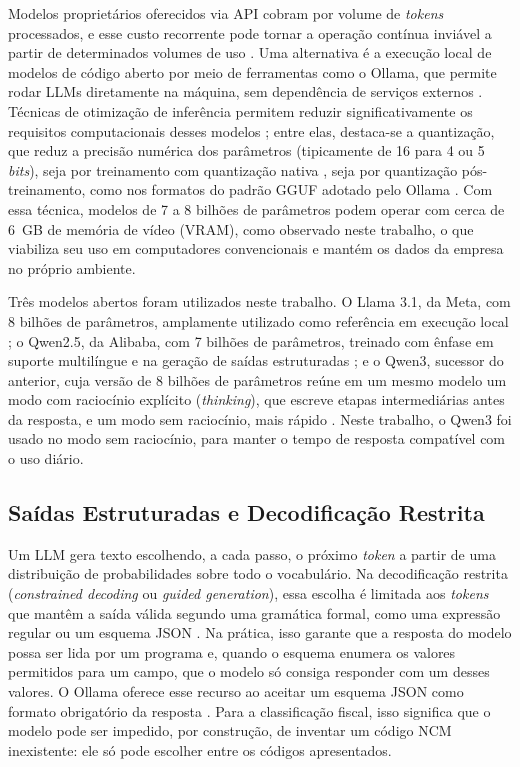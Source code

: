 Modelos proprietários oferecidos via API cobram por volume de \textit{tokens} processados, e esse custo recorrente pode tornar a operação contínua inviável a partir de determinados volumes de uso \cite{pan2025costbenefit}. Uma alternativa é a execução local de modelos de código aberto por meio de ferramentas como o Ollama, que permite rodar LLMs diretamente na máquina, sem dependência de serviços externos \cite{ollama2023}. Técnicas de otimização de inferência permitem reduzir significativamente os requisitos computacionais desses modelos \cite{zhou2024efficientllm}; entre elas, destaca-se a quantização, que reduz a precisão numérica dos parâmetros (tipicamente de 16 para 4 ou 5 \textit{bits}), seja por treinamento com quantização nativa \cite{liu2024llmqat}, seja por quantização pós-treinamento, como nos formatos do padrão GGUF adotado pelo Ollama \cite{ollama2023}. Com essa técnica, modelos de 7 a 8 bilhões de parâmetros podem operar com cerca de 6~GB de memória de vídeo (VRAM), como observado neste trabalho, o que viabiliza seu uso em computadores convencionais e mantém os dados da empresa no próprio ambiente.

Três modelos abertos foram utilizados neste trabalho. O Llama 3.1, da Meta, com 8 bilhões de parâmetros, amplamente utilizado como referência em execução local \cite{grattafiori2024llama3}; o Qwen2.5, da Alibaba, com 7 bilhões de parâmetros, treinado com ênfase em suporte multilíngue e na geração de saídas estruturadas \cite{qwen2024qwen25}; e o Qwen3, sucessor do anterior, cuja versão de 8 bilhões de parâmetros reúne em um mesmo modelo um modo com raciocínio explícito (\textit{thinking}), que escreve etapas intermediárias antes da resposta, e um modo sem raciocínio, mais rápido \cite{yang2025qwen3}. Neste trabalho, o Qwen3 foi usado no modo sem raciocínio, para manter o tempo de resposta compatível com o uso diário.

\subsection{Saídas Estruturadas e Decodificação Restrita}

Um LLM gera texto escolhendo, a cada passo, o próximo \textit{token} a partir de uma distribuição de probabilidades sobre todo o vocabulário. Na decodificação restrita (\textit{constrained decoding} ou \textit{guided generation}), essa escolha é limitada aos \textit{tokens} que mantêm a saída válida segundo uma gramática formal, como uma expressão regular ou um esquema JSON \cite{willard2023guided}. Na prática, isso garante que a resposta do modelo possa ser lida por um programa e, quando o esquema enumera os valores permitidos para um campo, que o modelo só consiga responder com um desses valores. O Ollama oferece esse recurso ao aceitar um esquema JSON como formato obrigatório da resposta \cite{ollama2023}. Para a classificação fiscal, isso significa que o modelo pode ser impedido, por construção, de inventar um código NCM inexistente: ele só pode escolher entre os códigos apresentados.

